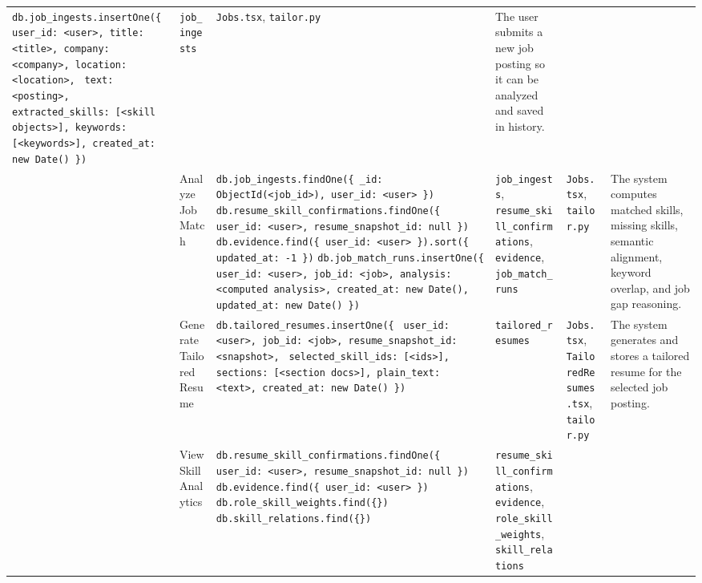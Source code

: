 \documentclass[11pt]{article}
\begin{document}
\begin{landscape}
\begin{longtable}{@{}p{0.28in}p{1.15in}p{3.3in}p{1.25in}p{1.35in}p{1.9in}@{}}
\texttt{db.job\_ingests.insertOne(\{} \newline
\texttt{ user\_id: <user>, title: <title>, company: <company>, location: <location>,} \newline
\texttt{ text: <posting>, extracted\_skills: [<skill objects>], keywords: [<keywords>], created\_at: new Date() \})} &
\texttt{job\_ingests} &
\texttt{Jobs.tsx}, \texttt{tailor.py} &
The user submits a new job posting so it can be analyzed and saved in history. \\
\addlinespace
9 &
Analyze Job Match &
\texttt{db.job\_ingests.findOne(\{ \_id: ObjectId(<job\_id>), user\_id: <user> \})} \newline
\texttt{db.resume\_skill\_confirmations.findOne(\{ user\_id: <user>, resume\_snapshot\_id: null \})} \newline
\texttt{db.evidence.find(\{ user\_id: <user> \}).sort(\{ updated\_at: -1 \})} \newline
\texttt{db.job\_match\_runs.insertOne(\{} \newline
\texttt{ user\_id: <user>, job\_id: <job>, analysis: <computed analysis>, created\_at: new Date(), updated\_at: new Date() \})} &
\texttt{job\_ingests}, \texttt{resume\_skill\_confirmations}, \texttt{evidence}, \texttt{job\_match\_runs} &
\texttt{Jobs.tsx}, \texttt{tailor.py} &
The system computes matched skills, missing skills, semantic alignment, keyword overlap, and job gap reasoning. \\
\addlinespace
10 &
Generate Tailored Resume &
\texttt{db.tailored\_resumes.insertOne(\{} \newline
\texttt{ user\_id: <user>, job\_id: <job>, resume\_snapshot\_id: <snapshot>,} \newline
\texttt{ selected\_skill\_ids: [<ids>], sections: [<section docs>], plain\_text: <text>, created\_at: new Date() \})} &
\texttt{tailored\_resumes} &
\texttt{Jobs.tsx}, \texttt{TailoredResumes.tsx}, \texttt{tailor.py} &
The system generates and stores a tailored resume for the selected job posting. \\
\addlinespace
11 &
View Skill Analytics &
\texttt{db.resume\_skill\_confirmations.findOne(\{ user\_id: <user>, resume\_snapshot\_id: null \})} \newline
\texttt{db.evidence.find(\{ user\_id: <user> \})} \newline
\texttt{db.role\_skill\_weights.find(\{\})} \newline
\texttt{db.skill\_relations.find(\{\})} &
\texttt{resume\_skill\_confirmations}, \texttt{evidence}, \texttt{role\_skill\_weights}, \texttt{skill\_relations} &

\end{longtable}
\end{landscape}
\end{document}
